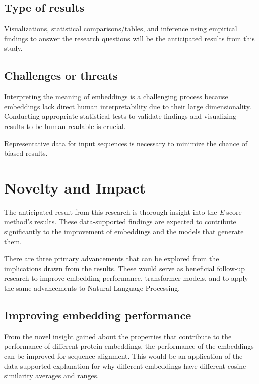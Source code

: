 \documentclass[
	letterpaper, %
	10pt, %
]{journalArticle}
\begin{document}
\subsection{Type of results}
Visualizations, statistical comparisons/tables, and inference using empirical findings to answer the research questions will be the anticipated results from this study.

\subsection{Challenges or threats}
Interpreting the meaning of embeddings is a challenging process because embeddings lack direct human interpretability due to their large dimensionality. Conducting appropriate statistical tests to validate findings and visualizing results to be human-readable is crucial.

Representative data for input sequences is necessary to minimize the chance of biased results.

\section{Novelty and Impact}

The anticipated result from this research is thorough insight into the \textit{E}-score method's results. These data-supported findings are expected to contribute significantly to the improvement of embeddings and the models that generate them.

There are three primary advancements that can be explored from the implications drawn from the results. These would serve as beneficial follow-up research to improve embedding performance, transformer models, and to apply the same advancements to Natural Language Processing.

\subsection{Improving embedding performance}

From the novel insight gained about the properties that contribute to the performance of different protein embeddings, the performance of the embeddings can be improved for sequence alignment. This would be an application of the data-supported explanation for why different embeddings have different cosine similarity averages and ranges.
\end{document}
